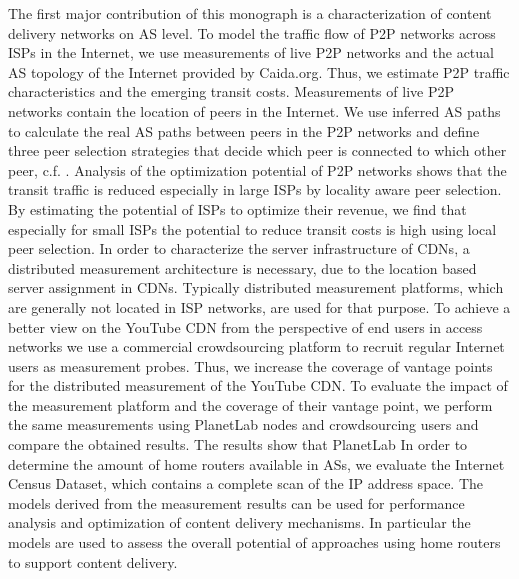 The first major contribution of this monograph is a characterization of content delivery networks on AS level.
To model the traffic flow of P2P networks across ISPs in the Internet, we use measurements of live P2P networks and the actual AS topology of the Internet provided by Caida.org.
Thus, we estimate P2P traffic characteristics and the emerging transit costs.
Measurements of live P2P networks contain the location of peers in the Internet.
We use inferred AS paths to calculate the real AS paths between peers in the P2P networks and define three peer selection strategies that decide which peer is connected to which other peer, c.f. \cite{burger2012profit}.
Analysis of the optimization potential of P2P networks shows that the transit traffic is reduced especially in large ISPs by locality aware peer selection.
By estimating the potential of ISPs to optimize their revenue, we find that especially for small ISPs the potential to reduce transit costs is high using local peer selection.
In order to characterize the server infrastructure of CDNs, a distributed measurement architecture is necessary, due to the location based server assignment in CDNs.
Typically distributed measurement platforms, which are generally not located in ISP networks, are used for that purpose.
To achieve a better view on the YouTube CDN from the perspective of end users in access networks we use a commercial crowdsourcing platform to recruit regular Internet users as measurement probes.
Thus, we increase the coverage of vantage points for the distributed measurement of the YouTube CDN.
To evaluate the impact of the measurement platform and the coverage of their vantage point, we perform the same measurements using PlanetLab nodes and
crowdsourcing users and compare the obtained results.
The results show that PlanetLab
In order to determine the amount of home routers available in ASs, we evaluate the Internet Census Dataset, which contains a complete scan of the IP address space.
The models derived from the measurement results can be used for performance analysis and optimization of content delivery mechanisms.
In particular the models are used to assess the overall potential of approaches using home routers to support content delivery.

